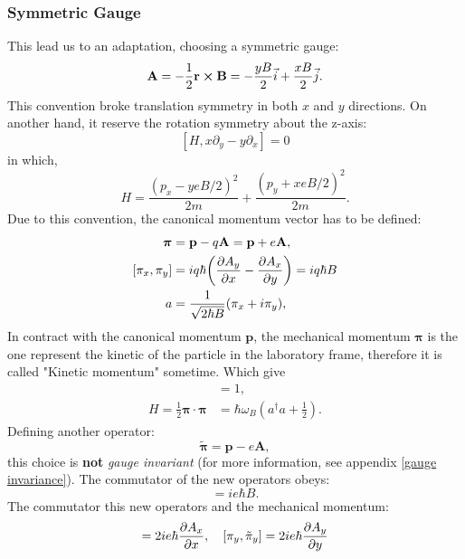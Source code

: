 \documentclass[unnumsec,webpdf,modern,large]{mam-authoring-template}%
\theoremstyle{thmstyleone}%
\theoremstyle{thmstyletwo}%
\theoremstyle{thmstylethree}%
\begin{document}
\begin{appendices}
\subsubsection{Symmetric Gauge}
\quad This lead us to an adaptation, choosing a symmetric gauge:
\begin{equation}\label{Symmetric Gauge}
	\textbf{A} = -\frac{1}{2} \textbf{r} \cross \textbf{B} = -\frac{y B}{2} \vec{i} + \frac{x B}{2} \vec{j}.
\end{equation}
\quad This convention broke translation symmetry in both \(x\) and \(y\) directions. On another hand, it reserve the rotation symmetry about the z-axis:
$$[H,x \partial_y - y\partial_x] = 0$$
in which,
\begin{equation}
	H = \frac{(p_x - yeB/2)^2}{2m} + \frac{(p_y + xeB/2)^2}{2m}.
\end{equation}
\quad Due to this convention, the canonical momentum vector has to be defined:
 \begin{align}
     \bm{\pi} &= \textbf{p} - q\textbf{A}= \textbf{p} + e\textbf{A},\\\label{pi com.}
     \comm{\pi_x}{\pi_y} &= iq\hbar \bigg(\pdv{A_y}{x} - \pdv{A_x}{y}\bigg) = iq\hbar B\\
 	 a&= \frac{1}{\sqrt{2\hbar B}} (\pi_x + i\pi_y),
 \end{align}
\quad In contract with the canonical  momentum \(\textbf{p}\), the mechanical momentum \(\bm{\pi}\) is the one represent the kinetic of the particle in the laboratory frame, therefore it is called "Kinetic momentum" sometime. Which give
\begin{align*}
	[a,a^\dagger] &= 1,\\
	H = \frac{1}{2} \bm{\pi}\cdot\bm{\pi} &= \hbar \omega_B (a^\dagger a +\frac{1}{2}).
\end{align*}
Defining another operator:
\begin{equation}
\bm{\tilde{\pi}} = \textbf{p} - e\textbf{A},
\end{equation}
this choice is \textbf{not} \textit{gauge invariant} (for more information, see appendix \ref{gauge invariance}). The commutator of the new operators obeys:
\begin{equation}
	[\bm{\tilde{\pi}}_x,\bm{\tilde{\pi}}_y] = ie\hbar B.
\end{equation}
\quad The commutator this new operators and the mechanical momentum:
\begin{equation}
	[\pi_x,\tilde{\pi}_x] = 2 i e\hbar \pdv{A_x}{x},\quad [\pi_y,\tilde{\pi}_y] = 2 i e\hbar \pdv{A_y}{y}
\end{equation}

\end{appendices}
\end{document}
